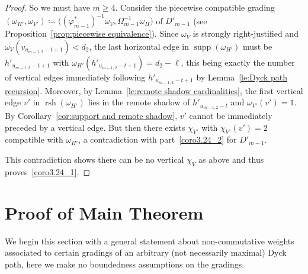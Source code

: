 \documentclass[ALCO,ThmDefs,Unicode,epreuves]{cedram}
\DeclareMathOperator{\supp}{supp}
\DeclareMathOperator{\rsh}{rsh}
\begin{document}
\begin{proof}
 So we must have $m\ge4$.
 Consider the piecewise compatible grading $(\omega_{H'},\omega_{V'})\coloneqq \big((\varphi^*_{m-1})^{-1}\omega_V,\Omega_{m-1}^{-1}\omega_H\big)$ of $D'_{m-1}$ (see Proposition~\ref{prop:piecewise equivalence}).
 Since $\omega_V$ is strongly right-justified and $\omega_V(v_{u_{m-1,2}-t+1})<d_2$, the last horizontal edge in $\supp(\omega_{H'})$ must be $h'_{u_{m-1,2}-t+1}$ with $\omega_{H'}(h'_{u_{m-1,2}-t+1})=d_2-\ell$, this being exactly the number of vertical edges immediately following $h'_{u_{m-1,2}-t+1}$ by Lemma~\ref{le:Dyck path recursion}.
 Moreover, by Lemma~\ref{le:remote shadow cardinalities}, the first vertical edge $v'$ in $\rsh(\omega_{H'})$ lies in the remote shadow of $h'_{u_{m-1,2}-t}$ and $\omega_{V'}(v')=1$.
 By Corollary~\ref{cor:support and remote shadow}, $v'$ cannot be immediately preceded by a vertical edge.
 But then there exists $\chi_{V'}$ with $\chi_{V'}(v')=2$ compatible with $\omega_{H'}$, a contradiction with part~\ref{coro3.24_2} for $D'_{m-1}$.
 
 This contradiction shows there can be no vertical $\chi_V$ as above and thus proves~\ref{coro3.24_1}.
\end{proof}


\section{Proof of Main Theorem}
\label{sec:proof of main}

\noindent
We begin this section with a general statement about non-commutative weights associated to certain gradings of an arbitrary (\ie not necessarily maximal) Dyck path, here we make no boundedness assumptions on the gradings.
\end{document}
